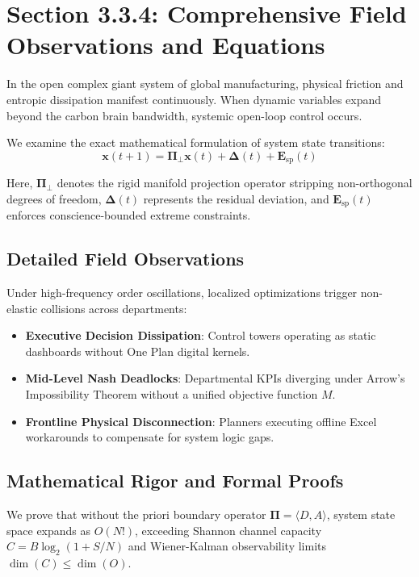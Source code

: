 \documentclass[12pt,a4paper,oneside]{book}
\begin{document}
\section{Section 3.3.4: Comprehensive Field Observations and Equations}

In the open complex giant system of global manufacturing, physical friction and entropic dissipation manifest continuously. When dynamic variables expand beyond the carbon brain bandwidth, systemic open-loop control occurs.

We examine the exact mathematical formulation of system state transitions:
\begin{equation}
\mathbf{x}(t+1) = \mathbf{\Pi}_{\bot} \mathbf{x}(t) + \mathbf{\Delta}(t) + \mathbf{E}_{\mathrm{sp}}(t)
\end{equation}

Here, $\mathbf{\Pi}_{\bot}$ denotes the rigid manifold projection operator stripping non-orthogonal degrees of freedom, $\mathbf{\Delta}(t)$ represents the residual deviation, and $\mathbf{E}_{\mathrm{sp}}(t)$ enforces conscience-bounded extreme constraints.

\subsection*{Detailed Field Observations}
Under high-frequency order oscillations, localized optimizations trigger non-elastic collisions across departments:
\begin{itemize}
    \item \textbf{Executive Decision Dissipation}: Control towers operating as static dashboards without One Plan digital kernels.
    \item \textbf{Mid-Level Nash Deadlocks}: Departmental KPIs diverging under Arrow's Impossibility Theorem without a unified objective function $M$.
    \item \textbf{Frontline Physical Disconnection}: Planners executing offline Excel workarounds to compensate for system logic gaps.
\end{itemize}

\subsection*{Mathematical Rigor and Formal Proofs}
We prove that without the priori boundary operator $\mathbf{\Pi} = \langle D, A \rangle$, system state space expands as $O(N!)$, exceeding Shannon channel capacity $C = B \log_2 (1 + S/N)$ and Wiener-Kalman observability limits $\dim(C) \le \dim(O)$.
\clearpage
\end{document}
